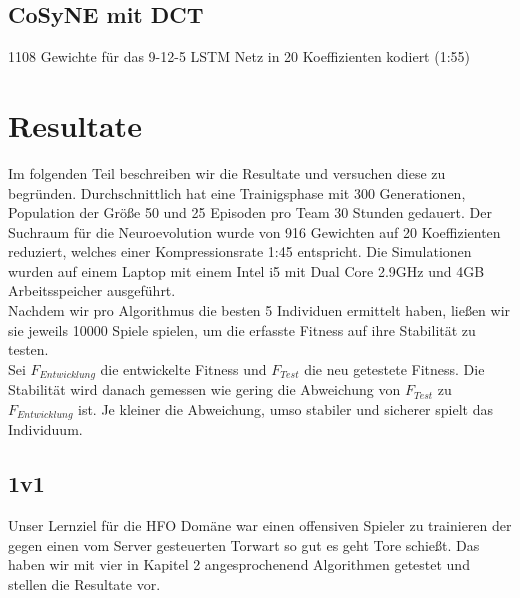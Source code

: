         \subsection{CoSyNE mit DCT}
            1108 Gewichte für das 9-12-5 LSTM Netz in 20 Koeffizienten kodiert (1:55)

    \section{Resultate}
        Im folgenden Teil beschreiben wir die Resultate und versuchen diese zu begründen. Durchschnittlich hat eine Trainigsphase mit 300 Generationen, Population der Größe 50 und 25 Episoden pro Team 30 Stunden gedauert. Der Suchraum für die Neuroevolution wurde von 916 Gewichten auf 20 Koeffizienten reduziert, welches einer Kompressionsrate 1:45 entspricht. Die Simulationen wurden auf einem Laptop mit einem Intel i5 mit Dual Core 2.9GHz und 4GB Arbeitsspeicher ausgeführt.\\[2mm]
        \noindent
        Nachdem wir pro Algorithmus die besten 5 Individuen ermittelt haben, ließen wir sie jeweils 10000 Spiele spielen, um die erfasste Fitness auf ihre Stabilität zu testen. \\[2mm]
        \noindent
        Sei $F_{Entwicklung}$ die entwickelte Fitness und $F_{Test}$ die neu getestete Fitness. Die Stabilität wird danach gemessen wie gering die Abweichung von $F_{Test}$ zu $F_{Entwicklung}$ ist. Je kleiner die Abweichung, umso stabiler und sicherer spielt das Individuum.\\

        \begin{mdframed}
        \begin{center}
            \hspace*{0mm} 
        \end{center}
        \end{mdframed}

        \subsection{1v1}
            Unser Lernziel für die HFO Domäne war einen offensiven Spieler zu trainieren der gegen einen vom Server gesteuerten Torwart so gut es geht Tore schießt. Das haben wir mit vier in Kapitel 2 angesprochenend Algorithmen getestet und stellen die Resultate vor. 

\newpage
